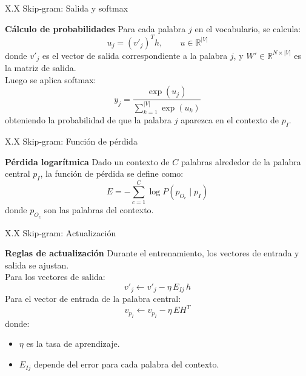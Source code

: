 \documentclass{beamer}
\begin{document}
\begin{frame}[fragile]{X.X Skip-gram: Salida y softmax}
	\begin{block}{\textbf{Cálculo de probabilidades}}
		\justifying
		Para cada palabra $j$ en el vocabulario, se calcula:
		\[
		u_j = (v'_j)^T h, \qquad u \in \mathbb{R}^{|V|}
		\]
		donde $v'_j$ es el vector de salida correspondiente a la palabra $j$, 
		y $W' \in \mathbb{R}^{N \times |V|}$ es la matriz de salida.\\
		\vspace{0.2cm}
		Luego se aplica softmax:
		\[
		y_j = \frac{\exp(u_j)}{\sum_{k=1}^{|V|} \exp(u_k)}
		\]
		obteniendo la probabilidad de que la palabra $j$ aparezca en el contexto de $p_I$.
	\end{block}
\end{frame}

\begin{frame}[fragile]{X.X Skip-gram: Función de pérdida}
	\begin{block}{\textbf{Pérdida logarítmica}}
		\justifying
		Dado un contexto de $C$ palabras alrededor de la palabra central $p_I$, 
		la función de pérdida se define como:
		\[
		E = - \sum_{c=1}^{C} \log P(p_{O_c} \mid p_I)
		\]
		donde $p_{O_c}$ son las palabras del contexto.\\
		\vspace{0.2cm}
	\end{block}
\end{frame}

\begin{frame}[fragile]{X.X Skip-gram: Actualización}
	\begin{block}{\textbf{Reglas de actualización}}
		\justifying
		Durante el entrenamiento, los vectores de entrada y salida se ajustan.\\
		\vspace{0.2cm}
		Para los vectores de salida:
		\[
		v'_j \leftarrow v'_j - \eta \, E_{Ij} \, h
		\]
		Para el vector de entrada de la palabra central:
		\[
		v_{p_I} \leftarrow v_{p_I} - \eta \, EH^T
		\]
		donde:
		\begin{itemize}
			\item $\eta$ es la tasa de aprendizaje.
			\item $E_{Ij}$ depende del error para cada palabra del contexto.
		\end{itemize}
	\end{block}
	
\end{frame}
\end{document}
